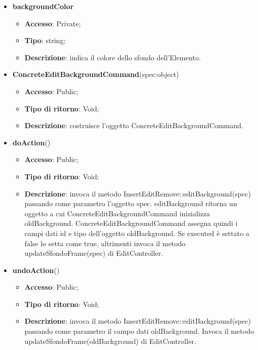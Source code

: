 {{{\begin{itemize}
\begin{itemize}
\begin{itemize}
\begin{itemize}
				\end{itemize}
				\item \textbf{backgroundColor}
				\begin{itemize}
					\item \textbf{Accesso}: Private;
					\item \textbf{Tipo}: string;
					\item \textbf{Descrizione}: indica il colore dello sfondo dell’Elemento.
				\end{itemize}
			\end{itemize}
				\end{itemize}
				\end{itemize}
			\begin{itemize}
				\item \textbf{ConcreteEditBackgroundCommand}(spec:object)
				\begin{itemize}
					\item \textbf{Accesso}: Public;
					\item \textbf{Tipo di ritorno}: Void;
					\item \textbf{Descrizione}: costruisce l’oggetto ConcreteEditBackgroundCommand.
				\end{itemize}
				\item \textbf{doAction}()
				\begin{itemize}
					\item \textbf{Accesso}: Public;
					\item \textbf{Tipo di ritorno}: Void;
					\item \textbf{Descrizione}: invoca il metodo InsertEditRemove::editBackground(spec) passando come parametro l'oggetto spec. editBackground ritorna un oggetto a cui ConcreteEditBackgroundCommand inizializza oldBackground. ConcreteEditBackgroundCommand assegna quindi i campi dati id e tipo dell'oggetto oldBackground. Se executed è settato a false lo setta come true, altrimenti invoca il metodo updateSfondoFrame(spec) di EditController.
				\end{itemize}
				\item \textbf{undoAction}()
				\begin{itemize}
					\item \textbf{Accesso}: Public;
					\item \textbf{Tipo di ritorno}: Void;
					\item \textbf{Descrizione}: invoca il metodo InsertEditRemove::editBackground(spec) passando come parametro il campo dati oldBackground. Invoca il metodo updateSfondoFrame(oldBackground) di EditController.
				\end{itemize}
			\end{itemize}
			}

}}
